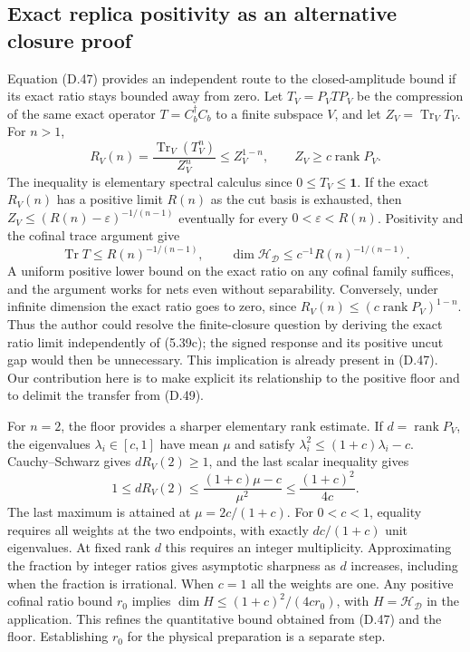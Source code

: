 \documentclass[11pt]{article}
\newcommand{\Tr}{\operatorname{Tr}}
\newcommand{\id}{\mathbf{1}}
\newcommand{\HH}{\mathcal H_{\mathcal D}}
\DeclareMathOperator{\rank}{rank}
\begin{document}
\subsection{Exact replica positivity as an alternative closure proof}\label{sec:replica}
Equation (D.47) provides an independent route to the closed-amplitude bound if its exact ratio stays bounded away from zero. Let $T_V=P_VTP_V$ be the compression of the same exact operator $T=C_b^\dagger C_b$ to a finite subspace $V$, and let $Z_V=\Tr_V T_V$. For $n>1$,
\begin{equation}\label{eq:replica-exact}
 R_V(n)=\frac{\Tr_V(T_V^n)}{Z_V^n}\le Z_V^{1-n},\qquad
 Z_V\ge c\rank P_V.
\end{equation}
The inequality is elementary spectral calculus since $0\le T_V\le\id$. If the exact $R_V(n)$ has a positive limit $R(n)$ as the cut basis is exhausted, then $Z_V\le(R(n)-\varepsilon)^{-1/(n-1)}$ eventually for every $0<\varepsilon<R(n)$. Positivity and the cofinal trace argument give
\begin{equation}\label{eq:replica-bound}
 \Tr T\le R(n)^{-1/(n-1)},\qquad
 \dim\HH\le c^{-1}R(n)^{-1/(n-1)}.
\end{equation}
A uniform positive lower bound on the exact ratio on any cofinal family suffices, and the argument works for nets even without separability. Conversely, under infinite dimension the exact ratio goes to zero, since $R_V(n)\le(c\rank P_V)^{1-n}$. Thus the author could resolve the finite-closure question by deriving the exact ratio limit independently of (5.39c); the signed response and its positive uncut gap would then be unnecessary. This implication is already present in (D.47). Our contribution here is to make explicit its relationship to the positive floor and to delimit the transfer from (D.49).

For $n=2$, the floor provides a sharper elementary rank estimate. If $d=\rank P_V$, the eigenvalues $\lambda_i\in[c,1]$ have mean $\mu$ and satisfy $\lambda_i^2\le(1+c)\lambda_i-c$. Cauchy--Schwarz gives $dR_V(2)\ge1$, and the last scalar inequality gives
\begin{equation}
 1\le dR_V(2)\le\frac{(1+c)\mu-c}{\mu^2}\le\frac{(1+c)^2}{4c}.
\end{equation}
The last maximum is attained at $\mu=2c/(1+c)$. For $0<c<1$, equality requires all weights at the two endpoints, with exactly $dc/(1+c)$ unit eigenvalues. At fixed rank $d$ this requires an integer multiplicity. Approximating the fraction by integer ratios gives asymptotic sharpness as $d$ increases, including when the fraction is irrational. When $c=1$ all the weights are one. Any positive cofinal ratio bound $r_0$ implies $\dim H\le(1+c)^2/(4cr_0)$, with $H=\HH$ in the application. This refines the quantitative bound obtained from (D.47) and the floor. Establishing $r_0$ for the physical preparation is a separate step.
\end{document}
